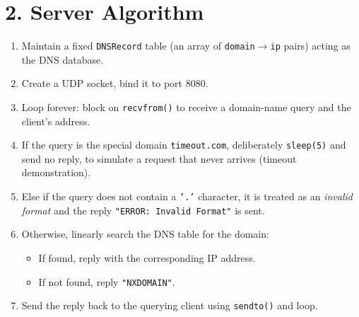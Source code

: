 \documentclass[11pt]{article}
\begin{document}
\section*{2. Server Algorithm}
\begin{enumerate}
  \item Maintain a fixed \texttt{DNSRecord} table (an array of \texttt{domain}$\to$\texttt{ip}
        pairs) acting as the DNS database.
  \item Create a UDP socket, bind it to port 8080.
  \item Loop forever: block on \texttt{recvfrom()} to receive a domain-name query and the
        client's address.
  \item If the query is the special domain \texttt{timeout.com}, deliberately \texttt{sleep(5)}
        and send no reply, to simulate a request that never arrives (timeout demonstration).
  \item Else if the query does not contain a \texttt{'.'} character, it is treated as an
        \emph{invalid format} and the reply \texttt{"ERROR: Invalid Format"} is sent.
  \item Otherwise, linearly search the DNS table for the domain:
  \begin{itemize}
    \item If found, reply with the corresponding IP address.
    \item If not found, reply \texttt{"NXDOMAIN"}.
  \end{itemize}
  \item Send the reply back to the querying client using \texttt{sendto()} and loop.
\end{enumerate}
\end{document}
